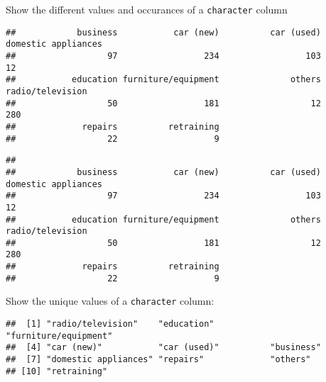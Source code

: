 \documentclass[
]{article}
\newenvironment{Shaded}{\begin{snugshade}}{\end{snugshade}}
\newcommand{\FunctionTok}[1]{\textcolor[rgb]{0.00,0.00,0.00}{#1}}
\newcommand{\NormalTok}[1]{#1}
\newcommand{\SpecialCharTok}[1]{\textcolor[rgb]{0.00,0.00,0.00}{#1}}
\begin{document}
Show the different values and occurances of a \texttt{character} column

\begin{Shaded}
\end{Shaded}

\begin{verbatim}
##            business           car (new)          car (used) domestic appliances 
##                  97                 234                 103                  12 
##           education furniture/equipment              others    radio/television 
##                  50                 181                  12                 280 
##             repairs          retraining 
##                  22                   9
\end{verbatim}

\begin{Shaded}
\end{Shaded}

\begin{verbatim}
## 
##            business           car (new)          car (used) domestic appliances 
##                  97                 234                 103                  12 
##           education furniture/equipment              others    radio/television 
##                  50                 181                  12                 280 
##             repairs          retraining 
##                  22                   9
\end{verbatim}

Show the unique values of a \texttt{character} column:

\begin{Shaded}
\end{Shaded}

\begin{verbatim}
##  [1] "radio/television"    "education"           "furniture/equipment"
##  [4] "car (new)"           "car (used)"          "business"           
##  [7] "domestic appliances" "repairs"             "others"             
## [10] "retraining"
\end{verbatim}
\end{document}
